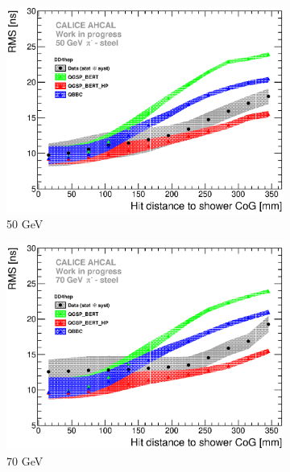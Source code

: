 \begin{figure}[htbp!]
  \hfill
  \begin{subfigure}[t]{0.49\textwidth}
    \centering
    \includegraphics[width=1\textwidth]{../Thesis_Plots/Timing/Pions/Plots/ComparisonToSim/RMS_Radius_50GeV_BL_DD4hep.eps}
    \caption{50 GeV}\label{fig:Radius_BL_RMS_SimData_50GeV_DD4hep}
  \end{subfigure}
  \hfill
  \begin{subfigure}[t]{0.49\textwidth}
    \centering
    \includegraphics[width=1\textwidth]{../Thesis_Plots/Timing/Pions/Plots/ComparisonToSim/RMS_Radius_70GeV_BL_DD4hep.eps}
    \caption{70 GeV}\label{fig:Radius_BL_RMS_SimData_70GeV_DD4hep}
  \end{subfigure}
  \hfill
  \begin{subfigure}[t]{0.49\textwidth}

\end{subfigure}
\end{figure}
